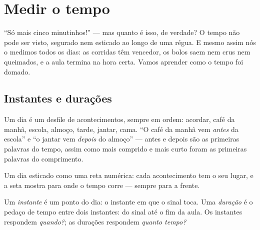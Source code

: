 \chapter{Medir o tempo}\label{ch:g2:measuring-time}

``Só mais cinco minutinhos!'' --- mas quanto é isso, de verdade? O
tempo não pode ser visto, segurado nem esticado ao longo de uma
régua. E mesmo assim nós o medimos todos os dias: as corridas têm
vencedor, os bolos saem nem crus nem queimados, e a aula termina na
hora certa. Vamos aprender como o tempo foi domado.

\section{Instantes e durações}

\begin{example}\label{ex:g2:measuring-time:order}
Um dia é um desfile de acontecimentos, sempre em ordem: acordar, café
da manhã, escola, almoço, tarde, jantar, cama. ``O café da manhã vem
\emph{antes} da escola'' e ``o jantar vem \emph{depois} do almoço''
--- antes e depois são as primeiras palavras do tempo, assim como
mais comprido e mais curto foram as primeiras palavras do
comprimento.
\end{example}

\begin{omfigure}

{\small Um dia esticado como uma reta numérica: cada acontecimento
tem o seu lugar, e a seta mostra para onde o tempo corre --- sempre
para a frente.}
\end{omfigure}

\begin{definition}[Duração]\label{def:g2:measuring-time:duration}
Um \emph{instante} é um ponto do dia: o instante em
que o sinal toca. Uma \emph{duração} é o pedaço de
tempo entre dois instantes: do sinal até o fim da aula. Os instantes
respondem \emph{quando?}; as durações respondem \emph{quanto tempo?}
\end{definition}

